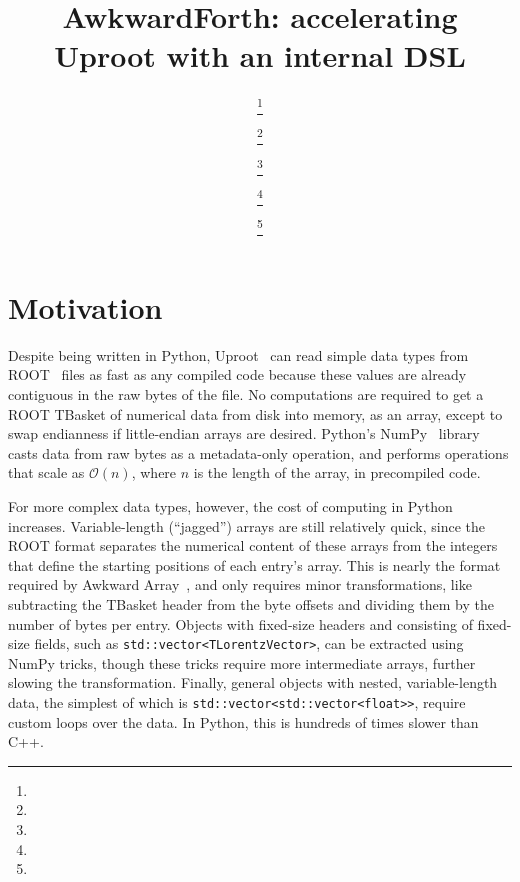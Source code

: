 \documentclass{webofc}
\begin{document}
\title{AwkwardForth: accelerating Uproot with an internal DSL}

\author{ \fnsep\thanks{} \and
         \fnsep\thanks{} \and
         \fnsep\thanks{} \and
         \fnsep\thanks{} \and
         \fnsep\thanks{}}



\maketitle

\section{Motivation}

Despite being written in Python, Uproot~\cite{uproot} can read simple data types from ROOT~\cite{root} files as fast as any compiled code because these values are already contiguous in the raw bytes of the file. No computations are required to get a ROOT TBasket of numerical data from disk into memory, as an array, except to swap endianness if little-endian arrays are desired. Python's NumPy~\cite{numpy} library casts data from raw bytes as a metadata-only operation, and performs operations that scale as $\mathcal{O}(n)$, where $n$ is the length of the array, in precompiled code.

For more complex data types, however, the cost of computing in Python increases. Variable-length (``jagged'') arrays are still relatively quick, since the ROOT format separates the numerical content of these arrays from the integers that define the starting positions of each entry's array. This is nearly the format required by Awkward Array~\cite{awkward}, and only requires minor transformations, like subtracting the TBasket header from the byte offsets and dividing them by the number of bytes per entry. Objects with fixed-size headers and consisting of fixed-size fields, such as \texttt{std::vector<TLorentzVector>}, can be extracted using NumPy tricks, though these tricks require more intermediate arrays, further slowing the transformation. Finally, general objects with nested, variable-length data, the simplest of which is \texttt{std::vector<std::vector<float>>}, require custom loops over the data. In Python, this is hundreds of times slower than C++.
\end{document}
